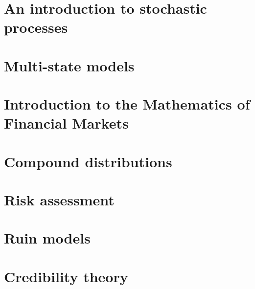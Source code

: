 \documentclass{article}
\begin{document}
\section{An introduction to stochastic processes}
\section{Multi-state models}
\section{Introduction to the Mathematics of Financial Markets}
\section{Compound distributions}
\section{Risk assessment}
\section{Ruin models}
\section{Credibility theory}
\end{document}
